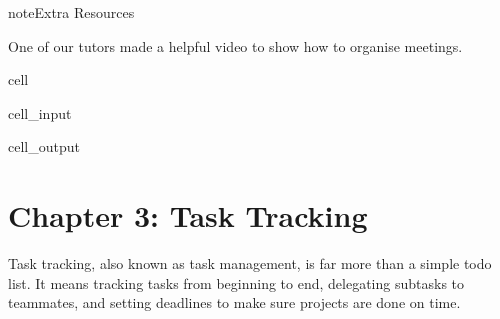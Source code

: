 \documentclass[letterpaper,10pt,english]{jupyterBook}
\begin{document}
\sphinxAtStartPar
{}

\begin{sphinxadmonition}{note}{Extra Resources}

\sphinxAtStartPar
One of our tutors made a helpful video to show how to organise meetings.
\end{sphinxadmonition}

\begin{sphinxuseclass}{cell}\begin{sphinxVerbatimInput}

\begin{sphinxuseclass}{cell_input}
\begin{sphinxVerbatim}[commandchars=\\\{\}]
   

\end{sphinxVerbatim}

\end{sphinxuseclass}\end{sphinxVerbatimInput}
\begin{sphinxVerbatimOutput}

\begin{sphinxuseclass}{cell_output}
\noindent{}

\end{sphinxuseclass}\end{sphinxVerbatimOutput}

\end{sphinxuseclass}

\chapter{Chapter 3: Task Tracking}
\label{\detokenize{chapter_3/task_tracking:chapter-3-task-tracking}}\label{\detokenize{chapter_3/task_tracking::doc}}
\sphinxAtStartPar
Task tracking, also known as task management, is far more than a simple
to\sphinxhyphen{}do list. It means tracking tasks from beginning to end, delegating
subtasks to teammates, and setting deadlines to make sure projects are
done on time.
\end{document}
